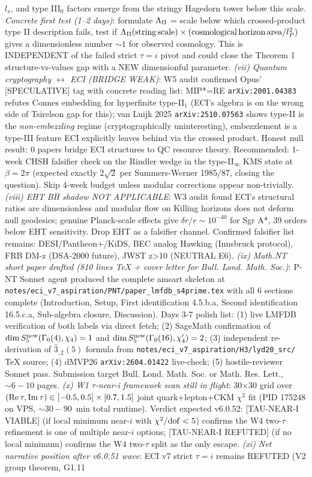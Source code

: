 \documentclass[reprint,amsmath,amssymb,aps,prd,superscriptaddress]{revtex4-2}
\providecommand{\1}{\mathbf{1}}
\begin{document}
$l_s$, and type III$_0$ factors emerge from the stringy Hagedorn tower below this scale. \emph{Concrete first test (1--2 days)}: formulate $\Lambda_{\rm II}$ = scale below which crossed-product type II description fails, test if $\Lambda_{\rm II}({\rm string\,scale}) \times ({\rm cosmological\,horizon\,area}/l_P^2)$ gives a dimensionless number $\sim 1$ for observed cosmology. This is INDEPENDENT of the failed strict $\tau = i$ pivot and could close the Theorem 1 structure-vs-values gap with a NEW dimensionful parameter. \emph{(vii) Quantum cryptography $\leftrightarrow$ ECI (BRIDGE WEAK)}: W5 audit confirmed Opus' [SPECULATIVE] tag with concrete reading list: MIP*=RE \texttt{arXiv:2001.04383} refutes Connes embedding for hyperfinite type-II$_1$ (ECI's algebra is on the wrong side of Tsirelson gap for this); van Luijk 2025 \texttt{arXiv:2510.07563} shows type-II is the \emph{non-embezzling} regime (cryptographically uninteresting), embezzlement is a type-III feature ECI explicitly leaves behind via the crossed product. Honest null result: 0 papers bridge ECI structures to QC resource theory. Recommended: 1-week CHSH falsifier check on the Rindler wedge in the type-II$_\infty$ KMS state at $\beta = 2\pi$ (expected exactly $2\sqrt{2}$ per Summers-Werner 1985/87, closing the question). Skip 4-week budget unless modular corrections appear non-trivially. \emph{(viii) EHT BH shadow NOT APPLICABLE}: W3 audit found ECI's structural ratios are dimensionless and modular flow on Killing horizons does not deform null geodesics; genuine Planck-scale effects give $\delta r/r \sim 10^{-40}$ for Sgr A*, 39 orders below EHT sensitivity. Drop EHT as a falsifier channel. Confirmed falsifier list remains: DESI/Pantheon+/KiDS, BEC analog Hawking (Innsbruck protocol), FRB DM-z (DSA-2000 future), JWST z>10 (NEUTRAL E6). \emph{(ix) Math.NT short paper drafted (810 lines TeX + cover letter for Bull. Lond. Math. Soc.)}: P-NT Sonnet agent produced the complete amsart skeleton at \texttt{notes/eci\_v7\_aspiration/PNT/paper\_lmfdb\_s4prime.tex} with all 6 sections complete (Introduction, Setup, First identification 4.5.b.a, Second identification 16.5.c.a, Sub-algebra closure, Discussion). Days 3-7 polish list: (1) live LMFDB verification of both labels via direct fetch; (2) SageMath confirmation of $\dim S_5^{\rm new}(\Gamma_0(4), \chi_4) = 1$ and $\dim S_5^{\rm new}(\Gamma_0(16), \chi_4') = 2$; (3) independent re-derivation of $\hat{3}_{,2}(5)$ formula from \texttt{notes/eci\_v7\_aspiration/H3/lyd20\_src/} TeX source; (4) dMVP26 \texttt{arXiv:2604.01422} live-check; (5) hostile-reviewer Sonnet pass. Submission target Bull. Lond. Math. Soc. or Math. Res. Lett., $\sim 6-10$ pages. \emph{(x) W1 $\tau$-near-i framework scan still in flight}: 30$\times$30 grid over $({\rm Re}\,\tau, {\rm Im}\,\tau) \in [-0.5, 0.5] \times [0.7, 1.5]$ joint quark+lepton+CKM $\chi^2$ fit (PID 175248 on VPS, $\sim 30-90$~min total runtime). Verdict expected v6.0.52: [TAU-NEAR-I VIABLE] (if local minimum near-$i$ with $\chi^2/\rm dof < 5$) confirms the W4 two-$\tau$ refinement is one of multiple near-$i$ options; [TAU-NEAR-I REFUTED] (if no local minimum) confirms the W4 two-$\tau$ split as the only escape. \emph{(xi) Net narrative position after v6.0.51 wave}: ECI v7 strict $\tau = i$ remains REFUTED (V2 group theorem, G1.11 
\end{document}
